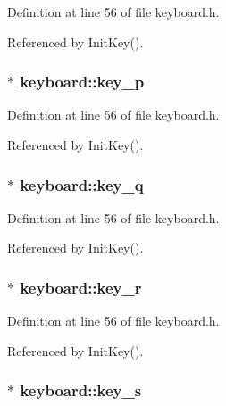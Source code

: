 Definition at line 56 of file keyboard.h.

Referenced by Init\-Key().
\subsubsection{ $\ast$ {\bf keyboard::key\_\-p}\hspace{0.3cm}{\tt  [private]}}\label{classkeyboard_keyboardr15}




Definition at line 56 of file keyboard.h.

Referenced by Init\-Key().
\subsubsection{ $\ast$ {\bf keyboard::key\_\-q}\hspace{0.3cm}{\tt  [private]}}\label{classkeyboard_keyboardr16}




Definition at line 56 of file keyboard.h.

Referenced by Init\-Key().
\subsubsection{ $\ast$ {\bf keyboard::key\_\-r}\hspace{0.3cm}{\tt  [private]}}\label{classkeyboard_keyboardr17}




Definition at line 56 of file keyboard.h.

Referenced by Init\-Key().
\subsubsection{ $\ast$ {\bf keyboard::key\_\-s}\hspace{0.3cm}{\tt  [private]}}\label{classkeyboard_keyboardr18}




